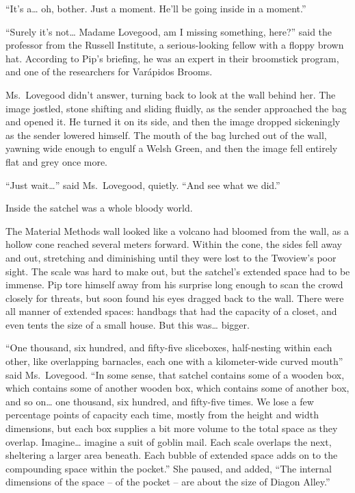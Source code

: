 ``It's a\ldots{} oh, bother. Just a moment. He'll be going inside in a
moment.''

``Surely it's not\ldots{} Madame Lovegood, am I missing something,
here?'' said the professor from the Russell Institute, a serious-looking
fellow with a floppy brown hat. According to Pip's briefing, he was an
expert in their broomstick program, and one of the researchers for
Varápidos Brooms.

Ms.~Lovegood didn't answer, turning back to look at the wall behind her.
The image jostled, stone shifting and sliding fluidly, as the sender
approached the bag and opened it. He turned it on its side, and then the
image dropped sickeningly as the sender lowered himself. The mouth of
the bag lurched out of the wall, yawning wide enough to engulf a Welsh
Green, and then the image fell entirely flat and grey once more.

``Just wait\ldots{}'' said Ms.~Lovegood, quietly. ``And see what we
did.''

Inside the satchel was a whole bloody world.

The Material Methods wall looked like a volcano had bloomed from the
wall, as a hollow cone reached several meters forward. Within the cone,
the sides fell away and out, stretching and diminishing until they were
lost to the Twoview's poor sight. The scale was hard to make out, but
the satchel's extended space had to be immense. Pip tore himself away
from his surprise long enough to scan the crowd closely for threats, but
soon found his eyes dragged back to the wall. There were all manner of
extended spaces: handbags that had the capacity of a closet, and even
tents the size of a small house. But this was\ldots{} bigger.

``One thousand, six hundred, and fifty-five sliceboxes, half-nesting
within each other, like overlapping barnacles, each one with a
kilometer-wide curved mouth'' said Ms.~Lovegood. ``In some sense, that
satchel contains some of a wooden box, which contains some of another
wooden box, which contains some of another box, and so on\ldots{} one
thousand, six hundred, and fifty-five times. We lose a few percentage
points of capacity each time, mostly from the height and width
dimensions, but each box supplies a bit more volume to the total space
as they overlap. Imagine\ldots{} imagine a suit of goblin mail. Each
scale overlaps the next, sheltering a larger area beneath. Each bubble
of extended space adds on to the compounding space within the pocket.''
She paused, and added, ``The internal dimensions of the space -- of the
pocket -- are about the size of Diagon Alley.''

